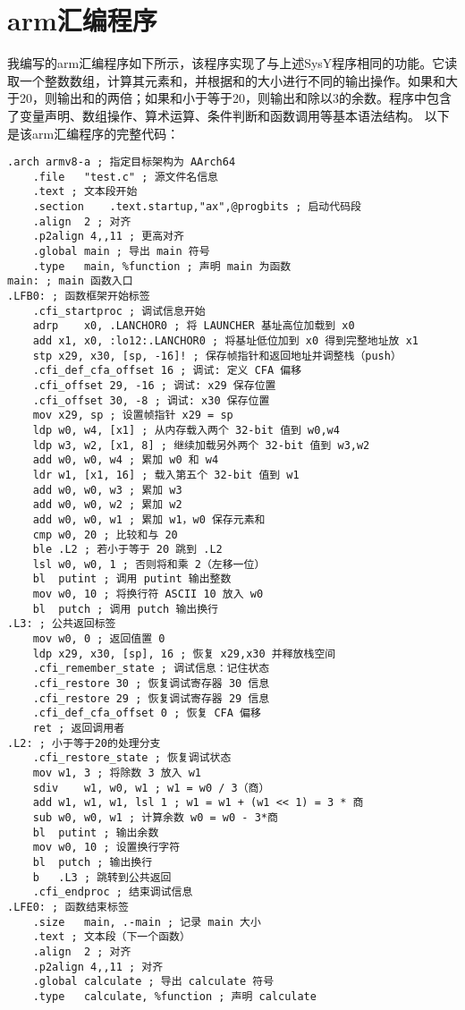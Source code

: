 \documentclass[UTF8,a4paper,10pt]{ctexart}
\begin{document}
\section{arm汇编程序}
我编写的arm汇编程序如下所示，该程序实现了与上述SysY程序相同的功能。它读取一个整数数组，计算其元素和，并根据和的大小进行不同的输出操作。如果和大于20，则输出和的两倍；如果和小于等于20，则输出和除以3的余数。程序中包含了变量声明、数组操作、算术运算、条件判断和函数调用等基本语法结构。
以下是该arm汇编程序的完整代码：
\begin{lstlisting}[title=逐列访问平凡算法,frame=trbl]
	.arch armv8-a ; 指定目标架构为 AArch64
	.file	"test.c" ; 源文件名信息
	.text ; 文本段开始
	.section	.text.startup,"ax",@progbits ; 启动代码段
	.align	2 ; 对齐
	.p2align 4,,11 ; 更高对齐
	.global	main ; 导出 main 符号
	.type	main, %function ; 声明 main 为函数
main: ; main 函数入口
.LFB0: ; 函数框架开始标签
	.cfi_startproc ; 调试信息开始
	adrp	x0, .LANCHOR0 ; 将 LAUNCHER 基址高位加载到 x0
	add	x1, x0, :lo12:.LANCHOR0 ; 将基址低位加到 x0 得到完整地址放 x1
	stp	x29, x30, [sp, -16]! ; 保存帧指针和返回地址并调整栈（push）
	.cfi_def_cfa_offset 16 ; 调试: 定义 CFA 偏移
	.cfi_offset 29, -16 ; 调试: x29 保存位置
	.cfi_offset 30, -8 ; 调试: x30 保存位置
	mov	x29, sp ; 设置帧指针 x29 = sp
	ldp	w0, w4, [x1] ; 从内存载入两个 32-bit 值到 w0,w4
	ldp	w3, w2, [x1, 8] ; 继续加载另外两个 32-bit 值到 w3,w2
	add	w0, w0, w4 ; 累加 w0 和 w4
	ldr	w1, [x1, 16] ; 载入第五个 32-bit 值到 w1
	add	w0, w0, w3 ; 累加 w3
	add	w0, w0, w2 ; 累加 w2
	add	w0, w0, w1 ; 累加 w1，w0 保存元素和
	cmp	w0, 20 ; 比较和与 20
	ble	.L2 ; 若小于等于 20 跳到 .L2
	lsl	w0, w0, 1 ; 否则将和乘 2（左移一位）
	bl	putint ; 调用 putint 输出整数
	mov	w0, 10 ; 将换行符 ASCII 10 放入 w0
	bl	putch ; 调用 putch 输出换行
.L3: ; 公共返回标签
	mov	w0, 0 ; 返回值置 0
	ldp	x29, x30, [sp], 16 ; 恢复 x29,x30 并释放栈空间
	.cfi_remember_state ; 调试信息：记住状态
	.cfi_restore 30 ; 恢复调试寄存器 30 信息
	.cfi_restore 29 ; 恢复调试寄存器 29 信息
	.cfi_def_cfa_offset 0 ; 恢复 CFA 偏移
	ret ; 返回调用者
.L2: ; 小于等于20的处理分支
	.cfi_restore_state ; 恢复调试状态
	mov	w1, 3 ; 将除数 3 放入 w1
	sdiv	w1, w0, w1 ; w1 = w0 / 3（商）
	add	w1, w1, w1, lsl 1 ; w1 = w1 + (w1 << 1) = 3 * 商
	sub	w0, w0, w1 ; 计算余数 w0 = w0 - 3*商
	bl	putint ; 输出余数
	mov	w0, 10 ; 设置换行字符
	bl	putch ; 输出换行
	b	.L3 ; 跳转到公共返回
	.cfi_endproc ; 结束调试信息
.LFE0: ; 函数结束标签
	.size	main, .-main ; 记录 main 大小
	.text ; 文本段（下一个函数）
	.align	2 ; 对齐
	.p2align 4,,11 ; 对齐
	.global	calculate ; 导出 calculate 符号
	.type	calculate, %function ; 声明 calculate

\end{lstlisting}
\end{document}
